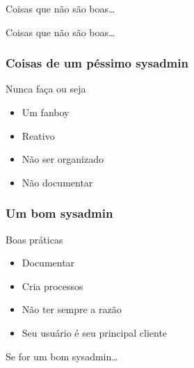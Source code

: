 \documentclass{beamer}
\begin{document}
\begin{frame}{Coisas que não são boas\dots}
  \begin{center}
         \par
  \end{center}
\end{frame}


\begin{frame}{Coisas que não são boas\dots}
  \begin{center}
         \par
  \end{center}
\end{frame}


\begin{frame}
    \frametitle{Coisas de um péssimo sysadmin}
        \begin{block}{Nunca faça ou seja}
	 \begin{itemize}
	    \item Um fanboy
	    \item Reativo
	    \item Não ser organizado
	    \item Não documentar
         \end{itemize}
    \end{block}
\end{frame}

\begin{frame}
    \frametitle{Um bom sysadmin}
        \begin{block}{Boas práticas}
	 \begin{itemize}
	    \item Documentar
	    \item Cria processos
	    \item Não ter sempre a razão
	    \item Seu usuário é seu principal cliente
         \end{itemize}
    \end{block}
\end{frame}



\begin{frame}{Se for um bom sysadmin\dots}
  \begin{center}
         \par
  \end{center}
\end{frame}
\end{document}
